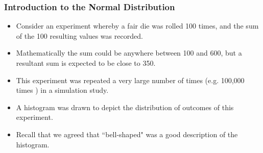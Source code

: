 \documentclass{beamer}
\begin{document}
\begin{frame}
	
	\frametitle{Introduction to the Normal Distribution}
	\begin{itemize}
		\item
		Consider an experiment whereby a fair die was rolled 100 times, and the sum of the 100 resulting values was recorded.
		\item Mathematically the sum could be anywhere between 100 and 600, but a resultant sum is expected to be close to 350.
		\item
		This experiment was repeated a very large number of times (e.g. 100,000 times ) in a simulation study.
		\item
		A histogram was drawn to depict the distribution of outcomes of this experiment.
		\item Recall that we agreed that ``bell-shaped" was a good description of the histogram.
		
	\end{itemize}
\end{frame}

\end{document}
